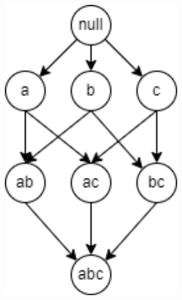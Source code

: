 \documentclass[paper=a4, fontsize=11pt]{scrartcl} %
\begin{document}
\begin{center}
    \includegraphics[width=75mm]{include/itemset lattice.png}
\end{center}
\end{document}
